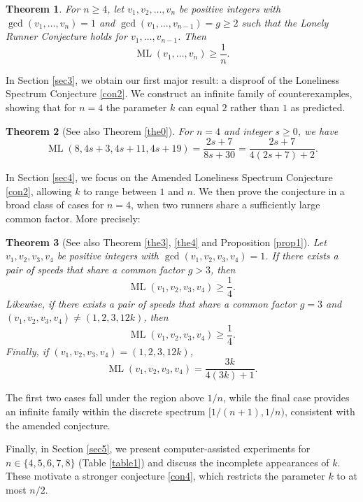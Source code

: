 \documentclass[11pt]{amsart}
\newtheorem{theorem}{Theorem}[section]
\DeclareMathOperator{\ML}{ML}
\begin{document}
\begin{theorem}
    For $n \geq 4$, let $v_1, v_2, \ldots, v_n$ be positive integers with $\gcd(v_1,\ldots, v_n) = 1$ and $\gcd(v_1,\ldots,v_{n-1}) = g \geq 2$ such that the Lonely Runner Conjecture holds for $v_1, \ldots, v_{n-1}$. Then
    $$
    \ML(v_1,\ldots,v_n) \geq \frac{1}{n}.
    $$
\end{theorem}

In Section \ref{sec3}, we obtain our first major result: a disproof of the Loneliness Spectrum Conjecture \ref{con2}. We construct an infinite family of counterexamples, showing that for $n=4$ the parameter $k$ can equal $2$ rather than $1$ as predicted.

\begin{theorem}[See also Theorem \ref{the0}]
    For $n = 4$ and integer $s \geq 0$, we have
    $$
    \ML(8,4s + 3,4s + 11,4s + 19) = \frac{2s + 7}{8s + 30} = \frac{2s + 7}{4(2s + 7) + 2}.
    $$
\end{theorem}

In Section \ref{sec4}, we focus on the Amended Loneliness Spectrum Conjecture \ref{con2}, allowing $k$ to range between $1$ and $n$. We then prove the conjecture in a broad class of cases for $n=4$, when two runners share a sufficiently large common factor. More precisely:

\begin{theorem}[See also Theorem \ref{the3}, \ref{the4} and Proposition \ref{prop1}]
    Let $v_1, v_2, v_3, v_4$ be positive integers with $\gcd(v_1,v_2,v_3,v_4) = 1$. If there exists a pair of speeds that share a common factor $g > 3$, then
    $$
    \ML(v_1,v_2,v_3,v_4) \geq \frac{1}{4}.
    $$
    Likewise, if there exists a pair of speeds that share a common factor $g = 3$ and $(v_1,v_2,v_3,v_4) \not= (1,2,3,12k)$, then
    $$
    \ML(v_1,v_2,v_3,v_4) \geq \frac{1}{4}.
    $$
    Finally, if $(v_1, v_2, v_3, v_4) = (1,2,3,12k)$,
    $$
    \ML(v_1,v_2,v_3,v_4) = \frac{3k}{4(3k) + 1}.
    $$
\end{theorem}

The first two cases fall under the region above $1/n$, while the final case provides an infinite family within the discrete spectrum $[1/(n+1),1/n)$, consistent with the amended conjecture.

Finally, in Section \ref{sec5}, we present computer-assisted experiments for $n \in \{4,5,6,7,8\}$ (Table \ref{table1}) and discuss the incomplete appearances of $k$. These motivate a stronger conjecture \ref{con4}, which restricts the parameter $k$ to at most $n/2$.
\end{document}
